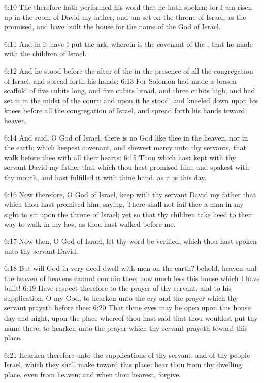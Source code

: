 6:10 The \LORD therefore hath performed his word that he hath spoken: for I am risen up in the room of David my father, and am set on the throne of Israel, as the \LORD promised, and have built the house for the name of the \LORD God of Israel.

6:11 And in it have I put the ark, wherein is the covenant of the \LORD, that he made with the children of Israel.

6:12 And he stood before the altar of the \LORD in the presence of all the congregation of Israel, and spread forth his hands: 6:13 For Solomon had made a brasen scaffold of five cubits long, and five cubits broad, and three cubits high, and had set it in the midst of the court: and upon it he stood, and kneeled down upon his knees before all the congregation of Israel, and spread forth his hands toward heaven.

6:14 And said, O \LORD God of Israel, there is no God like thee in the heaven, nor in the earth; which keepest covenant, and shewest mercy unto thy servants, that walk before thee with all their hearts: 6:15 Thou which hast kept with thy servant David my father that which thou hast promised him; and spakest with thy mouth, and hast fulfilled it with thine hand, as it is this day.

6:16 Now therefore, O \LORD God of Israel, keep with thy servant David my father that which thou hast promised him, saying, There shall not fail thee a man in my sight to sit upon the throne of Israel; yet so that thy children take heed to their way to walk in my law, as thou hast walked before me.

6:17 Now then, O \LORD God of Israel, let thy word be verified, which thou hast spoken unto thy servant David.

6:18 But will God in very deed dwell with men on the earth? behold, heaven and the heaven of heavens cannot contain thee; how much less this house which I have built!  6:19 Have respect therefore to the prayer of thy servant, and to his supplication, O \LORD my God, to hearken unto the cry and the prayer which thy servant prayeth before thee: 6:20 That thine eyes may be open upon this house day and night, upon the place whereof thou hast said that thou wouldest put thy name there; to hearken unto the prayer which thy servant prayeth toward this place.

6:21 Hearken therefore unto the supplications of thy servant, and of thy people Israel, which they shall make toward this place: hear thou from thy dwelling place, even from heaven; and when thou hearest, forgive.

